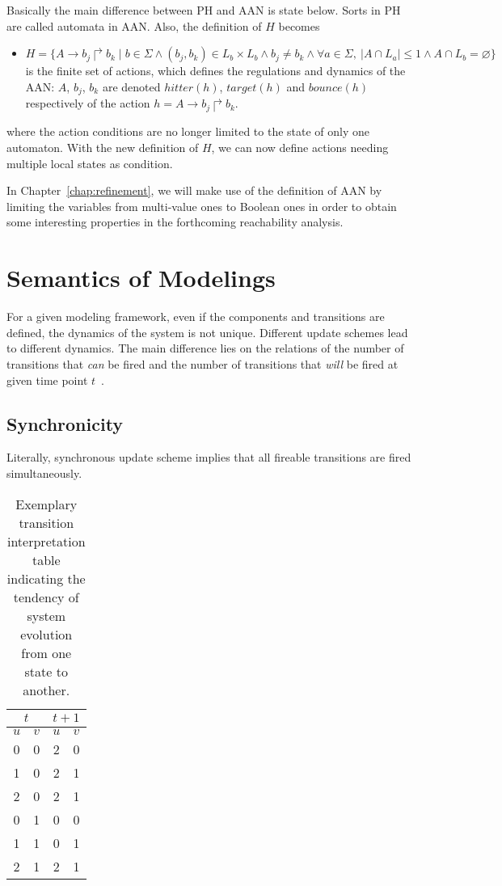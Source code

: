 Basically the main difference between PH and AAN is state below. 
Sorts in PH are called automata in AAN.
Also, the definition of $H$ becomes

\begin{itemize}
    \item $H=\{A\to b_j\Rsh b_k\mid b\in \Sigma \land (b_j,b_k)\in L_b\times L_b\land b_j\neq b_k\land \forall a \in \Sigma,\ |A\cap L_a|\leq 1 \land A\cap L_b=\varnothing\}$ is the finite set of actions, which defines the regulations and dynamics of the AAN: $A$, $b_j$, $b_k$ are denoted $hitter(h)$, $target(h)$ and $bounce(h)$ respectively of the action $h=A\to b_j\Rsh b_k$.
\end{itemize}

where the action conditions are no longer limited to the state of only one automaton.
With the new definition of $H$, we can now define actions needing multiple local states as condition.

In Chapter~\ref{chap:refinement}, we will make use of the definition of AAN by limiting the variables from multi-value ones to Boolean ones in order to obtain some interesting properties in the forthcoming reachability analysis.


\section{Semantics of Modelings}\label{sec:semantics}
For a given modeling framework, even if the components and transitions are defined, the dynamics of the system is not unique. 
Different update schemes lead to different dynamics.
The main difference lies on the relations of the number of transitions that %
\textit{can} be fired and the number of transitions that %
\textit{will} be fired at given time point $t$~\cite{ribeiro2018learning,chatain2018boolean}.

\subsection{Synchronicity}
Literally, synchronous update scheme implies that all fireable transitions are fired simultaneously.

\begin{table}[ht]
    \centering
    \begin{tabular}{cc|cc}
        \multicolumn{2}{c|}{$t$}&\multicolumn{2}{c}{$t+1$}\\
        \hline
        $u$ & $v$ & $u$ & $v$ \\
        \hline
        0 & 0 & 2 & 0 \\
        1 & 0 & 2 & 1 \\
        2 & 0 & 2 & 1 \\
        0 & 1 & 0 & 0 \\
        1 & 1 & 0 & 1 \\
        2 & 1 & 2 & 1 \\
    \end{tabular}
    \caption[Transition interpretation table]{Exemplary transition interpretation table indicating the tendency of system evolution from one state to another.}
    \label{tab:transTable}
\end{table}


